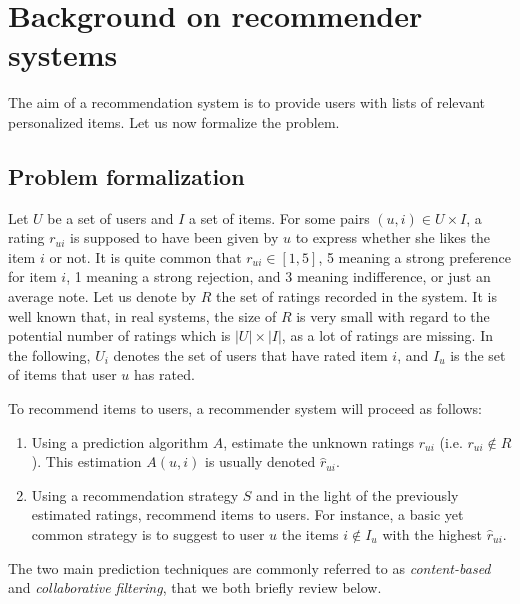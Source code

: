 \section{Background on recommender systems}\label{backReco}
The aim of a recommendation system is to provide users with lists of relevant
personalized items.
Let us now formalize the problem.

\subsection{Problem formalization}
Let $U$ be a set of users and $I$ a set of items. For some pairs $(u,i) \in U
\times I$, a rating  $r_{ui}$ is supposed to have been given by $u$ to express
whether she likes the item $i$ or not. 
It is quite common that  $r_{ui} \in [1, 5]$, 5 meaning a strong preference for
item $i$, 1 meaning a strong rejection, and 3 meaning indifference, or just an
average note.  Let us denote by $R$ the set of ratings recorded in the system. It
is well known that, in real systems, the size of $R$ is very small with regard
to the potential number of ratings which is $|U| \times |I|$, as a lot of
ratings are missing. In the following, $U_i$ denotes the set of users that have
rated item $i$, and $I_u$ is the set of items that
user $u$ has rated. 

To recommend items to users, a recommender system will proceed as follows:
\begin{enumerate}
\item Using a prediction algorithm $A$, estimate the unknown ratings $r_{ui}$
(i.e. $r_{ui} \notin R$). This estimation $A(u, i)$ is usually denoted
$\hat{r}_{ui}$.  
\item Using a recommendation strategy $S$ and in the light of the previously
estimated ratings, recommend items to users. For instance, a basic yet
common strategy is to suggest to user $u$ the items $i \notin I_u$ with the
highest $\hat{r}_{ui}$.
\end{enumerate}
The two main prediction techniques are commonly referred to as {\it
content-based} and {\it collaborative filtering}, that we both briefly review
below.


